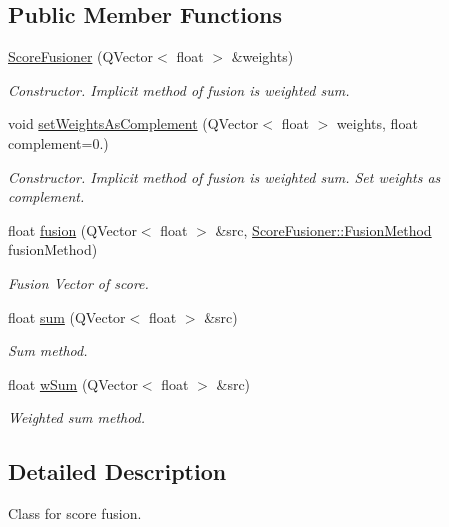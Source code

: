 \subsection*{Public Member Functions}
\begin{DoxyCompactItemize}
\item 
\hyperlink{class_score_fusioner_a61b9b1b5c1e4ce3fdea672f2efd269d2}{Score\+Fusioner} (Q\+Vector$<$ float $>$ \&weights)
\begin{DoxyCompactList}\small\item\em Constructor. Implicit method of fusion is weighted sum. \end{DoxyCompactList}\item 
void \hyperlink{class_score_fusioner_aadab5b01ddfb09d26c93212d83f0fa3c}{set\+Weights\+As\+Complement} (Q\+Vector$<$ float $>$ weights, float complement=0.)
\begin{DoxyCompactList}\small\item\em Constructor. Implicit method of fusion is weighted sum. Set weights as complement. \end{DoxyCompactList}\item 
float \hyperlink{class_score_fusioner_add16d5bae3281d59d12a2064d0916f08}{fusion} (Q\+Vector$<$ float $>$ \&src, \hyperlink{class_score_fusioner_a000eb98fb47d65c0fd37335d70efe2af}{Score\+Fusioner\+::\+Fusion\+Method} fusion\+Method)
\begin{DoxyCompactList}\small\item\em Fusion Vector of score. \end{DoxyCompactList}\item 
float \hyperlink{class_score_fusioner_acba5f63751da0e18ac74a123a9f37177}{sum} (Q\+Vector$<$ float $>$ \&src)
\begin{DoxyCompactList}\small\item\em Sum method. \end{DoxyCompactList}\item 
float \hyperlink{class_score_fusioner_afa3d0b428f49c4382558336f922cd6f6}{w\+Sum} (Q\+Vector$<$ float $>$ \&src)
\begin{DoxyCompactList}\small\item\em Weighted sum method. \end{DoxyCompactList}\end{DoxyCompactItemize}


\subsection{Detailed Description}
Class for score fusion. 

